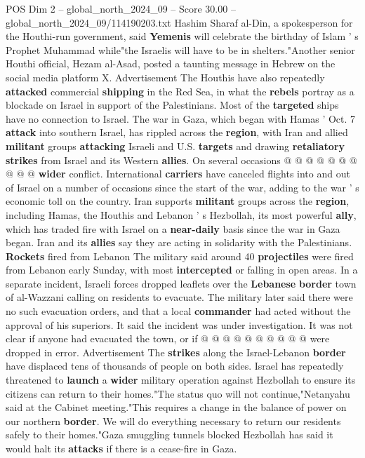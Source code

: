 \begin{textsample}{POS Dim 2 – global\_north\_2024\_09 – Score 30.00 – global\_north\_2024\_09/114190203.txt}
Hashim Sharaf al-Din, a spokesperson for the Houthi-run government, said \textbf{Yemenis} will celebrate the birthday of Islam ' s Prophet Muhammad while"the Israelis will have to be in shelters."Another senior Houthi official, Hezam al-Asad, posted a taunting message in Hebrew on the social media platform X.
Advertisement The Houthis have also repeatedly \textbf{attacked} commercial \textbf{shipping} in the Red Sea, in what the \textbf{rebels} portray as a blockade on Israel in support of the Palestinians.
Most of the \textbf{targeted} ships have no connection to Israel.
The war in Gaza, which began with Hamas ' Oct. 7 \textbf{attack} into southern Israel, has rippled across the \textbf{region}, with Iran and allied \textbf{militant} groups \textbf{attacking} Israeli and U.S. \textbf{targets} and drawing \textbf{retaliatory} \textbf{strikes} from Israel and its Western \textbf{allies}.
On several occasions @ @ @ @ @ @ @ @ @ @ \textbf{wider} conflict.
International \textbf{carriers} have canceled flights into and out of Israel on a number of occasions since the start of the war, adding to the war ' s economic toll on the country.
Iran supports \textbf{militant} groups across the \textbf{region}, including Hamas, the Houthis and Lebanon ' s Hezbollah, its most powerful \textbf{ally}, which has traded fire with Israel on a \textbf{near-daily} basis since the war in Gaza began.
Iran and its \textbf{allies} say they are acting in solidarity with the Palestinians. \textbf{Rockets} fired from Lebanon The military said around 40 \textbf{projectiles} were fired from Lebanon early Sunday, with most \textbf{intercepted} or falling in open areas.
In a separate incident, Israeli forces dropped leaflets over the \textbf{Lebanese} \textbf{border} town of al-Wazzani calling on residents to evacuate.
The military later said there were no such evacuation orders, and that a local \textbf{commander} had acted without the approval of his superiors.
It said the incident was under investigation.
It was not clear if anyone had evacuated the town, or if @ @ @ @ @ @ @ @ @ @ were dropped in error.
Advertisement The \textbf{strikes} along the Israel-Lebanon \textbf{border} have displaced tens of thousands of people on both sides.
Israel has repeatedly threatened to \textbf{launch} a \textbf{wider} military operation against Hezbollah to ensure its citizens can return to their homes."The status quo will not continue,"Netanyahu said at the Cabinet meeting."This requires a change in the balance of power on our northern \textbf{border}.
We will do everything necessary to return our residents safely to their homes."Gaza smuggling tunnels blocked Hezbollah has said it would halt its \textbf{attacks} if there is a cease-fire in Gaza.

\end{textsample}
